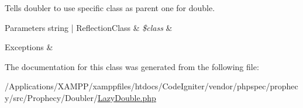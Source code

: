 Tells doubler to use specific class as parent one for double.


\begin{DoxyParams}[1]{Parameters}
string | Reflection\+Class & {\em \$class} & \\
\hline
\end{DoxyParams}

\begin{DoxyExceptions}{Exceptions}
{\em } & \\
\hline
\end{DoxyExceptions}


The documentation for this class was generated from the following file\+:\begin{DoxyCompactItemize}
\item 
/\+Applications/\+X\+A\+M\+P\+P/xamppfiles/htdocs/\+Code\+Igniter/vendor/phpspec/prophecy/src/\+Prophecy/\+Doubler/\mbox{\hyperlink{_lazy_double_8php}{Lazy\+Double.\+php}}\end{DoxyCompactItemize}
